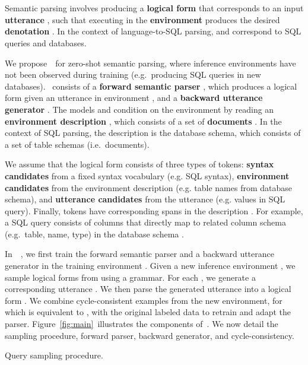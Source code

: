 \documentclass[11pt,a4paper]{article}
\begin{document}
\section{\papertitle}
\label{sec:method}
 
Semantic parsing involves producing a \textbf{logical form}  that corresponds to an input \textbf{utterance} , such that executing  in the \textbf{environment}  produces the desired \textbf{denotation} .
In the context of language-to-SQL parsing,  and  correspond to SQL queries and databases.

We propose~\modelnameshort~for zero-shot semantic parsing, where inference environments have not been observed during training (e.g.~producing SQL queries in new databases).
\modelnameshort~consists of a \textbf{forward semantic parser} , which produces a logical form  given an utterance  in environment , and a \textbf{backward utterance generator} .
The models  and  condition on the environment by reading an \textbf{environment description} , which consists of a set of \textbf{documents} .
In the context of SQL parsing, the description is the database schema, which consists of a set of table schemas (i.e.~documents).

We assume that the logical form consists of three types of tokens: \textbf{syntax candidates}  from a fixed syntax vocabulary (e.g. SQL syntax), \textbf{environment candidates}  from the environment description (e.g. table names from database schema), and \textbf{utterance candidates}  from the utterance (e.g. values in SQL query).
Finally,  tokens have corresponding spans in the description .
For example, a SQL query  consists of columns  that directly map to related column schema (e.g.~table, name, type) in the database schema .

In~\modelnameshort~, we first train the forward semantic parser  and a backward utterance generator  in the training environment .
Given a new inference environment , we sample logical forms  from  using a grammar.
For each , we generate a corresponding utterance .
We then parse the generated utterance into a logical form .
We combine cycle-consistent examples from the new environment, for which is equivalent to , with the original labeled data to retrain and adapt the parser.
Figure~\ref{fig:main}~illustrates the components of~\modelnameshort.
We now detail the sampling procedure, forward parser, backward generator, and cycle-consistency.


\begin{algorithm}[t]
\caption{Query sampling procedure.}
\label{alg:sample}
\begin{algorithmic}[1]
  \small
  \State 
  \State 
  \For{}
    \IIf{}
      
    \EndIIf
  \EndFor
  \State 
  \State 
  \For{}
    \State 
    \State 
  \EndFor
  \For{}
    \State 
    \State 
    \State 
  \EndFor
  
\end{algorithmic}
\end{algorithm}
\end{document}
